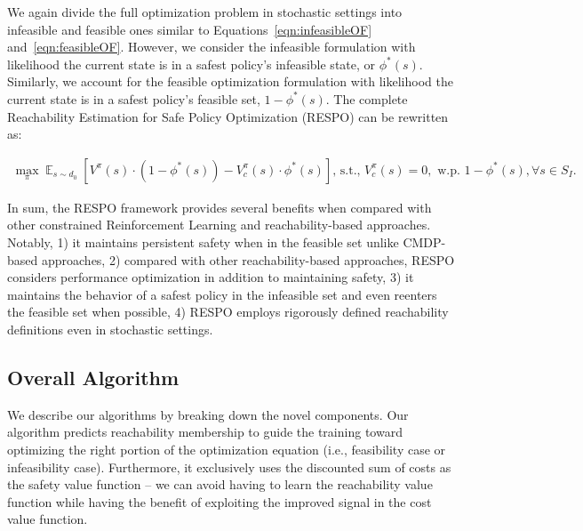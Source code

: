\documentclass{article}
\theoremstyle{definition}
\DeclareMathOperator*{\E}{\mathbb{E}}
\begin{document}
We again divide the full optimization problem in stochastic settings into infeasible and feasible ones similar to Equations~\ref{eqn:infeasibleOF} and~\ref{eqn:feasibleOF}. However, we consider the infeasible formulation with likelihood the current state is in a safest policy's infeasible state, or $\phi^*(s)$. Similarly, we account for the feasible optimization formulation with likelihood the current state is in a safest policy's feasible set, $1-\phi^*(s)$. The complete Reachability Estimation for Safe Policy Optimization (RESPO) can be rewritten as: 



\vspace{-13pt}
\begin{equation}
\tag{RESPO}
\label{eqn:StochasticOF}
\begin{split}
\max_\pi \E_{s\sim d_0} [V^{\pi}(s)\cdot (1-\phi^*(s)) - V^{\pi}_c(s)\cdot \phi^*(s)] \text{, s.t., }V^{\pi}_c (s) = 0, \text{ w.p. } 1-\phi^*(s), \forall s\in S_I.
\end{split}
\end{equation}

\vspace{-5pt}






In sum, the RESPO framework provides several benefits when compared with other constrained Reinforcement Learning and reachability-based approaches. Notably, 1) it maintains persistent safety when in the feasible set unlike CMDP-based approaches, 2) compared with other reachability-based approaches, RESPO considers performance optimization in addition to maintaining safety, 3) it maintains the behavior of a safest policy in the infeasible set and even reenters the feasible set when possible, 4) RESPO employs rigorously defined reachability definitions even in stochastic settings.

\subsection{Overall Algorithm}
\label{section:PReach}
We describe our algorithms by breaking down the novel components. Our algorithm predicts reachability membership to guide the training toward optimizing the right portion of the optimization equation (i.e., feasibility case or infeasibility case). Furthermore, it exclusively uses the discounted sum of costs as the safety value function -- we can avoid having to learn the reachability value function while having the benefit of exploiting the improved signal in the cost value function.
\end{document}
